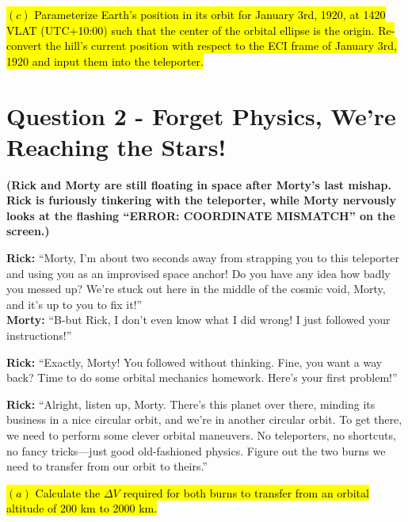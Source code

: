 \documentclass[a4paper, 12pt]{exam}
\begin{document}
\hl{$(c)$ Parameterize Earth's position in its orbit for January 3rd, 1920, at 1420 VLAT (UTC+10:00) such that the center of the orbital ellipse is the origin. Re-convert the hill's current position with respect to the ECI frame of January 3rd, 1920 and input them into the teleporter.}

	\pagebreak
	
	\section*{Question 2 - Forget Physics, We’re Reaching the Stars!}

\noindent \textbf{(Rick and Morty are still floating in space after Morty’s last mishap. Rick is furiously tinkering with the teleporter, while Morty nervously looks at the flashing “ERROR: COORDINATE MISMATCH” on the screen.)}

\bigskip
\noindent \textbf{Rick:} “Morty, I’m about two seconds away from strapping you to this teleporter and using you as an improvised space anchor! Do you have any idea how badly you messed up? We’re stuck out here in the middle of the cosmic void, Morty, and it’s up to you to fix it!” \\

\noindent \textbf{Morty:} “B-but Rick, I don’t even know what I did wrong! I just followed your instructions!” \bigskip

\noindent \textbf{Rick:} “Exactly, Morty! You followed without thinking. Fine, you want a way back? Time to do some orbital mechanics homework. Here’s your first problem!”

\bigskip

\noindent \textbf{Rick:} “Alright, listen up, Morty. There’s this planet over there, minding its business in a nice circular orbit, and we’re in another circular orbit. To get there, we need to perform some clever orbital maneuvers. No teleporters, no shortcuts, no fancy tricks—just good old-fashioned physics. Figure out the two burns we need to transfer from our orbit to theirs.”

\bigskip

\hl{$(a)$ Calculate the $\Delta V$ required for both burns to transfer from an orbital altitude of 200 km to 2000 km.}
\end{document}
